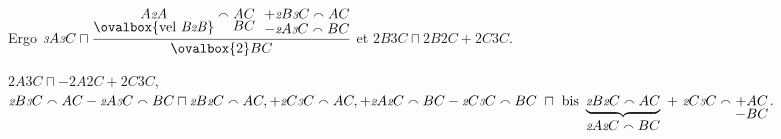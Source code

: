 \pend
%
\pstart\noindent Ergo 
%
${\scriptstyle \textit{3}}A{\scriptstyle \textit{3}}C 
\sqcap 
\displaystyle\frac
{
	\underset
		{
			\displaystyle \textup{\ovalbox{vel \textit{B{\scriptsize2}B}}}
		}{
			A{\scriptstyle \textit{2}}A
		} 
\smallfrown 
\underset{\displaystyle BC}{AC}\ \
\underset{\displaystyle -{\scriptstyle \textit{2}}A{\scriptstyle \textit{3}}C \smallfrown BC}{+{\scriptstyle \textit{2}}B{\scriptstyle \textit{3}}C \smallfrown AC}}{\ovalbox{2}BC}$
%
et
{\lemma{}} 
%
\pend
\pstart\noindent
%
${\scriptstyle \textit{2}}B{\scriptstyle \textit{3}}C \sqcap {\scriptstyle \textit{2}}B{\scriptstyle \textit{2}}C + {\scriptstyle \textit{2}}C{\scriptstyle \textit{3}}C$.\rule[0cm]{0mm}{12pt}
%
%
${\scriptstyle \textit{2}}A{\scriptstyle \textit{3}}C \sqcap -{\scriptstyle \textit{2}}A{\scriptstyle \textit{2}}C + {\scriptstyle \textit{2}}C{\scriptstyle \textit{3}}C$\lbrack,\rbrack\
%
${\scriptstyle \textit{2}}B{\scriptstyle \textit{3}}C \smallfrown AC - {\scriptstyle \textit{2}}A{\scriptstyle \textit{3}}C \smallfrown BC \sqcap {\scriptstyle \textit{2}}B{\scriptstyle \textit{2}}C \smallfrown AC, +{\scriptstyle \textit{2}}C{\scriptstyle \textit{3}}C \smallfrown AC, + {\scriptstyle \textit{2}}A{\scriptstyle \textit{2}}C \smallfrown BC - {\scriptstyle \textit{2}}C{\scriptstyle \textit{3}}C \smallfrown BC\ \sqcap\ \textup{bis}\ \underbrace{{\scriptstyle \textit{2}}B{\scriptstyle \textit{2}}C \smallfrown AC}_{\displaystyle{\scriptstyle \textit{2}}A{\scriptstyle \textit{2}}C \smallfrown BC}\ +\ {\scriptstyle \textit{2}}C{\scriptstyle \textit{3}}C \smallfrown \underset{\displaystyle -BC}{+AC}$.%
